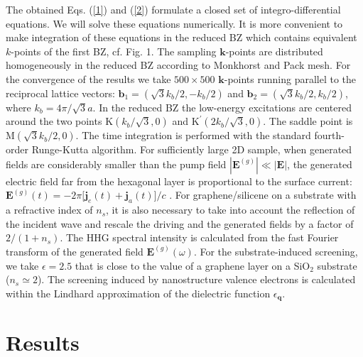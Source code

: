 \documentclass[reprint, superscriptaddress,  aps, pra]{revtex4-2}
\begin{document}
The obtained Eqs. (\ref{1}) and (\ref{2}) formulate a closed set of
integro-differential equations. We will solve these equations numerically.
It is more convenient to make integration of these equations in the reduced
BZ which contains equivalent $k$-points of the first BZ, cf. Fig. 1\textrm{.}
The sampling $\mathbf{k}$-points are distributed homogeneously in the
reduced BZ according to Monkhorst and Pack mesh. For the convergence of the
results we take $500\times 500$ $\mathbf{k}$-points running parallel to the
reciprocal lattice vectors: $\mathbf{b}_{1}=\left( \sqrt{3}%
k_{b}/2,-k_{b}/2\right) $ and $\mathbf{b}_{2}=\left( \sqrt{3}%
k_{b}/2,k_{b}/2\right) $, where $k_{b}=4\pi /\sqrt{3}a$. In the reduced BZ
the low-energy excitations are centered around the two points $\mathrm{K}%
\left( k_{b}/\sqrt{3},0\right) $ and $\mathrm{K}^{\prime }\left( 2k_{b}/%
\sqrt{3},0\right) $. The saddle point is $\mathrm{M}\left( \sqrt{3}%
k_{b}/2,0\right) $. The time integration is performed with the standard
fourth-order Runge-Kutta algorithm. For sufficiently large 2D sample, when
generated fields are considerably smaller than the pump field $\left\vert 
\mathbf{E}^{(g)}\right\vert \ll \left\vert \mathbf{E}\right\vert $, the
generated electric field far from the hexagonal layer is proportional to the
surface current: $\mathbf{E}^{(g)}(t)=-2\pi \lbrack \mathbf{j}_{e}(t)+ 
\mathbf{j}_{a}(t)]/c$ \cite{Mer18}. For graphene/silicene on a substrate
with a refractive index of $n_{s}$, it is also necessary to take into
account the reflection of the incident wave \cite{Stauber} and rescale the
driving and the generated fields by a factor of $2/(1+n_{s})$. The HHG
spectral intensity is calculated from the fast Fourier transform of the
generated field $\mathbf{E}^{(g)}(\omega )$. For the substrate-induced
screening, we take $\epsilon =2.5$ that is close to the value of a graphene
layer on a SiO$_{2}$ substrate ($n_{s}\simeq 2$). The screening induced by
nanostructure valence electrons is calculated within the Lindhard
approximation of the dielectric function $\epsilon _{\mathbf{q}}$.

\section{Results}
\end{document}
